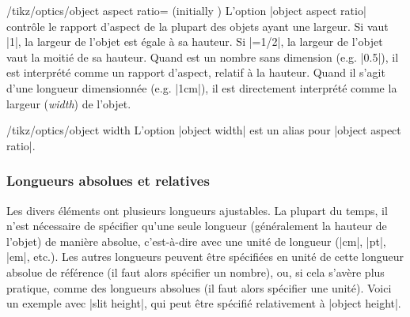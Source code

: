 \documentclass[a4paper]{ltxdoc}
\begin{document}
\begin{key}{/tikz/optics/object aspect ratio= (initially )}
    L'option |object aspect ratio| contrôle le rapport d'aspect de la plupart des objets ayant une largeur. Si  vaut |1|, la largeur de l'objet est égale à sa hauteur.
    Si |=1/2|, la largeur de l'objet vaut la moitié de sa hauteur. 
    Quand  est un nombre sans dimension (e.g. |0.5|), il est interprété comme un rapport d'aspect, relatif à la hauteur. Quand il s'agit d'une longueur dimensionnée (e.g. |1cm|), il est directement interprété comme la largeur (\emph{width}) de l'objet.

\begin{codeexample}[width=5cm]
\end{codeexample}
\end{key}

\begin{stylekey}{/tikz/optics/object width}
    L'option |object width| est un alias pour |object aspect ratio|.
\end{stylekey}

\subsubsection{Longueurs absolues et relatives}

Les divers éléments ont plusieurs longueurs ajustables. La plupart du temps, il n'est nécessaire de spécifier qu'une seule longueur (généralement la hauteur de l'objet) de manière absolue, c'est-à-dire avec une unité de longueur (|cm|, |pt|, |em|, etc.). Les autres longueurs peuvent être spécifiées en unité de cette longueur absolue de référence (il faut alors spécifier un nombre), ou, si cela s'avère plus pratique, comme des longueurs absolues (il faut alors spécifier une unité). Voici un exemple avec |slit height|, qui peut être spécifié relativement à |object height|.

\begin{codeexample}[width=6cm]
\end{codeexample}
\end{document}
